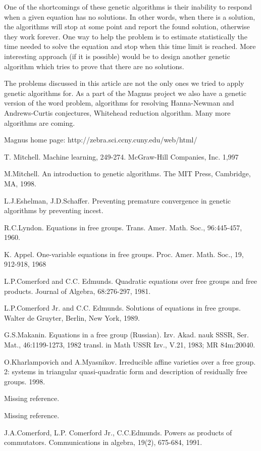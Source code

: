 \documentclass{article}
\begin{document}
One of the shortcomings of these genetic algorithms is their inability
to respond when a given equation has no solutions. In other words,
when there is a solution, the algorithms will stop at some point and
report the found solution, otherwise they work forever. One way to
help the problem is to estimate statistically the time needed to solve
the equation and stop when this time limit is reached. More
interesting approach (if it is possible) would be to design another
genetic algorithm which tries to prove that there are no solutions.

The problems discussed in this article are not the only ones we tried
to apply genetic algorithms for. As a part of the Magnus project we
also have a genetic version of the word problem, algorithms for
resolving Hanna-Newman and Andrews-Curtis conjectures, Whitehead
reduction algorithm. Many more algorithms are coming. 


\begin{thebibliography}{99}

 Magnus home page: http://zebra.sci.ccny.cuny.edu/web/html/

 T. Mitchell. Machine learning, 249-274. McGraw-Hill
Companies, Inc. 1,997

 M.Mitchell. An introduction to genetic algorithms. The
MIT Press, Cambridge, MA, 1998.

 L.J.Eshelman, J.D.Schaffer. Preventing premature
convergence in genetic algorithms by preventing incest. 

 R.C.Lyndon. Equations in free groups.
Trans. Amer. Math. Soc., 96:445-457, 1960.

 K. Appel. One-variable equations in free
groups. Proc. Amer. Math. Soc., 19, 912-918, 1968

 L.P.Comerford and C.C. Edmunds. Quadratic equations over free groups and free products. Journal of Algebra, 68:276-297, 1981.

 L.P.Comerford Jr. and C.C. Edmunds. Solutions of
equations in free groups. Walter de Gruyter, Berlin, New York, 1989.

 G.S.Makanin. Equations in a free group
(Russian). Izv. Akad. nauk SSSR, Ser. Mat., 46:1199-1273, 1982
transl. in Math USSR Izv., V.21, 1983; MR 84m:20040.

 O.Kharlampovich and A.Myasnikov. Irreducible affine
varieties over a free group. 2: systems in triangular quasi-quadratic
form and description of residually free groups. 1998.

 Missing reference.

 Missing reference.

 J.A.Comerford, L.P. Comerford Jr., C.C.Edmunds. Powers
as products of commutators. Communications in algebra, 19(2), 675-684,
1991.

\end{thebibliography}
\end{document}
